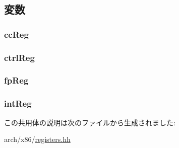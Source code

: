 \subsection{変数}
\hypertarget{unionX86ISA_1_1AnyReg_aabc908271213f14969b032b383032f9c}{
\subsubsection[{ccReg}]{ {\bf ccReg}}}
\label{unionX86ISA_1_1AnyReg_aabc908271213f14969b032b383032f9c}
\hypertarget{unionX86ISA_1_1AnyReg_acba32419a0324334387e4359d47f595c}{
\subsubsection[{ctrlReg}]{ {\bf ctrlReg}}}
\label{unionX86ISA_1_1AnyReg_acba32419a0324334387e4359d47f595c}
\hypertarget{unionX86ISA_1_1AnyReg_aca694db7faba0589c540d76f181f7068}{
\subsubsection[{fpReg}]{ {\bf fpReg}}}
\label{unionX86ISA_1_1AnyReg_aca694db7faba0589c540d76f181f7068}
\hypertarget{unionX86ISA_1_1AnyReg_a5889511f36b8bd7e83c3336195dff8a4}{
\subsubsection[{intReg}]{ {\bf intReg}}}
\label{unionX86ISA_1_1AnyReg_a5889511f36b8bd7e83c3336195dff8a4}


この共用体の説明は次のファイルから生成されました:\begin{DoxyCompactItemize}
\item 
arch/x86/\hyperlink{x86_2registers_8hh}{registers.hh}\end{DoxyCompactItemize}
